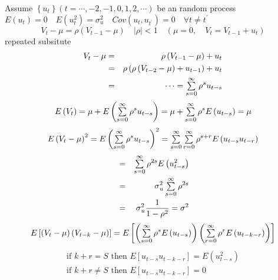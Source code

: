 \documentclass{article}
\begin{document}
Assume $\left\{ u_{t}\right\} \left( t=\cdots ,-2,-1,0,1,2,\cdots \right) $
be an random process $E\left( u_{t}\right) =0\quad E\left( u_{t}^{2}\right)
=\sigma _{u}^{2}\quad Cov\left( u_{t},u_{t^{\prime }}\right) =0\quad \forall
t\neq t^{\prime }$%
\begin{equation*}
V_{t}-\mu =\rho \left( V_{t-1}-\mu \right) \quad \left\vert \rho \right\vert
<1\quad \left( \mu =0,\quad V_{t}=V_{t-1}+u_{t}\right)
\end{equation*}%
repeated subsitute%
\begin{eqnarray*}
V_{t}-\mu &=&\rho \left( V_{t-1}-\mu \right) +u_{t} \\
&=&\rho \left( \rho \left( V_{t-2}-\mu \right) +u_{t-1}\right) +u_{t} \\
&=&\cdots =\tsum\limits_{s=0}^{\infty }\rho ^{s}u_{t-s}
\end{eqnarray*}%
\begin{equation*}
E\left( V_{t}\right) =\mu +E\left( \tsum\limits_{s=0}^{\infty }\rho
^{s}u_{t-s}\right) =\mu +\tsum\limits_{s=0}^{\infty }\rho ^{s}E\left(
u_{t-s}\right) =\mu
\end{equation*}%
\begin{equation*}
E\left( V_{t}-\mu \right) ^{2}=E\left( \tsum\limits_{s=0}^{\infty }\rho
^{s}u_{t-s}\right) ^{2}=\tsum\limits_{s=0}^{\infty
}\tsum\limits_{r=0}^{\infty }\rho ^{s+r}E\left( u_{t-s}u_{t-r}\right)
\end{equation*}%
\begin{eqnarray*}
&=&\tsum\limits_{s=0}^{\infty }\rho ^{2s}E\left( u_{t-s}^{2}\right) \\
&=&\sigma _{u}^{2}\tsum\limits_{s=0}^{\infty }\rho ^{2s} \\
&=&\sigma _{u}^{2}\frac{1}{1-\rho ^{2}}=\sigma ^{2}
\end{eqnarray*}%
\begin{equation*}
E\left[ \left( V_{t}-\mu \right) \left( V_{t-k}-\mu \right) \right] =E\left[
\left( \tsum\limits_{s=0}^{\infty }\rho ^{s}E\left( u_{t-s}\right) \right)
\left( \tsum\limits_{r=0}^{\infty }\rho ^{r}E\left( u_{t-k-r}\right) \right) %
\right]
\end{equation*}%
\begin{equation*}
\begin{array}{c}
\text{if }k+r=S\text{ then }E\left[ u_{t-s}u_{t-k-r}\right] =E\left(
u_{t-s}^{2}\right) \\ 
\text{if }k+r\neq S\text{ then }E\left[ u_{t-s}u_{t-k-r}\right] =0%
\end{array}%
\end{equation*}%
\end{document}
